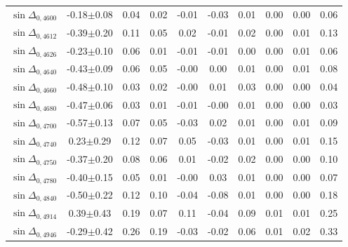 \begin{table}[H]
{\begin{tabular}{c|c|ccccccc|c}
$\sin\Delta_{0,4600}$ & -0.18$\pm$0.08 & 0.04 & 0.02 & -0.01 & -0.03 & 0.01 & 0.00 & 0.00 & 0.06\\
$\sin\Delta_{0,4612}$ & -0.39$\pm$0.20 & 0.11 & 0.05 & 0.02 & -0.01 & 0.02 & 0.00 & 0.01 & 0.13\\
$\sin\Delta_{0,4626}$ & -0.23$\pm$0.10 & 0.06 & 0.01 & -0.01 & -0.01 & 0.00 & 0.00 & 0.01 & 0.06\\
$\sin\Delta_{0,4640}$ & -0.43$\pm$0.09 & 0.06 & 0.05 & -0.00 & 0.00 & 0.01 & 0.00 & 0.01 & 0.08\\
$\sin\Delta_{0,4660}$ & -0.48$\pm$0.10 & 0.03 & 0.02 & -0.00 & 0.01 & 0.03 & 0.00 & 0.00 & 0.04\\
$\sin\Delta_{0,4680}$ & -0.47$\pm$0.06 & 0.03 & 0.01 & -0.01 & -0.00 & 0.01 & 0.00 & 0.00 & 0.03\\
$\sin\Delta_{0,4700}$ & -0.57$\pm$0.13 & 0.07 & 0.05 & -0.03 & 0.02 & 0.01 & 0.00 & 0.01 & 0.09\\
$\sin\Delta_{0,4740}$ & 0.23$\pm$0.29 & 0.12 & 0.07 & 0.05 & -0.03 & 0.01 & 0.00 & 0.01 & 0.15\\
$\sin\Delta_{0,4750}$ & -0.37$\pm$0.20 & 0.08 & 0.06 & 0.01 & -0.02 & 0.02 & 0.00 & 0.00 & 0.10\\
$\sin\Delta_{0,4780}$ & -0.40$\pm$0.15 & 0.05 & 0.01 & -0.00 & 0.03 & 0.01 & 0.00 & 0.00 & 0.07\\
$\sin\Delta_{0,4840}$ & -0.50$\pm$0.22 & 0.12 & 0.10 & -0.04 & -0.08 & 0.01 & 0.00 & 0.00 & 0.18\\
$\sin\Delta_{0,4914}$ & 0.39$\pm$0.43 & 0.19 & 0.07 & 0.11 & -0.04 & 0.09 & 0.01 & 0.01 & 0.25\\
$\sin\Delta_{0,4946}$ & -0.29$\pm$0.42 & 0.26 & 0.19 & -0.03 & -0.02 & 0.06 & 0.01 & 0.02 & 0.33\\

\hline\hline
\end{tabular}
}
\end{table}

